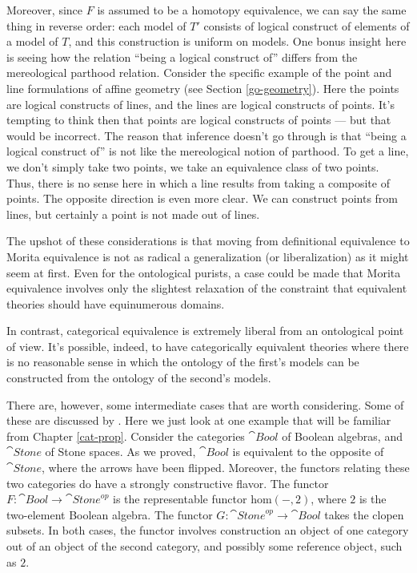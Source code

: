 Moreover, since $F$ is assumed to be a homotopy equivalence, we can
say the same thing in reverse order: each model of $T'$ consists of
logical construct of elements of a model of $T$, and this construction
is uniform on models.  One bonus insight here is seeing how the
relation ``being a logical construct of'' differs from the
mereological parthood relation.  Consider the specific example of the
point and line formulations of affine geometry (see Section
\ref{go-geometry}).  Here the points are logical constructs of lines,
and the lines are logical constructs of points.  It's tempting to
think then that points are logical constructs of points --- but that
would be incorrect.  The reason that inference doesn't go through is
that ``being a logical construct of'' is not like the mereological
notion of parthood.  To get a line, we don't simply take two points,
we take an equivalence class of two points.  Thus, there is no sense
here in which a line results from taking a composite of points.  The
opposite direction is even more clear.  We can construct points from
lines, but certainly a point is not made out of lines.

The upshot of these considerations is that moving from definitional
equivalence to Morita equivalence is not as radical a generalization
(or liberalization) as it might seem at first.  Even for the
ontological purists, a case could be made that Morita equivalence
involves only the slightest relaxation of the constraint that
equivalent theories should have equinumerous domains.

In contrast, categorical equivalence is extremely liberal from an
ontological point of view.  It's possible, indeed, to have
categorically equivalent theories where there is no reasonable sense
in which the ontology of the first's models can be constructed from
the ontology of the second's models.

There are, however, some intermediate cases that are worth
considering.  Some of these are discussed by \cite{hudetz-new}.  Here
we just look at one example that will be familiar from Chapter
\ref{cat-prop}.  Consider the categories $\cat{Bool}$ of Boolean
algebras, and $\cat{Stone}$ of Stone spaces.  As we proved,
$\cat{Bool}$ is equivalent to the opposite of $\cat{Stone}$, where the
arrows have been flipped.  Moreover, the functors relating these two
categories do have a strongly constructive flavor.  The functor
$F:\cat{Bool}\to\cat{Stone}^{op}$ is the representable functor
$\mathrm{hom}(-,2)$, where $2$ is the two-element Boolean algebra.
The functor $G:\cat{Stone}^{op}\to\cat{Bool}$ takes the clopen
subsets.  In both cases, the functor involves construction an object
of one category out of an object of the second category, and possibly
some reference object, such as $2$.

